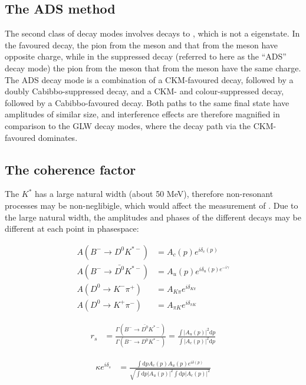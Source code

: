 \subsection{The ADS method}

The second class of decay modes involves \D decays to \Kmp\pipm, which is not a \CP eigenstate. In the favoured decay, the pion from the \D meson and that from the \Kstarm meson have opposite charge, while in the suppressed decay (referred to here as the ``ADS'' ~\cite{ADS,ADS-2001} decay mode) the pion from the \D meson that from the \Kstarm meson have the same charge. The ADS decay mode is a combination of a CKM-favoured \decay{\Bm}{\Dz\Kstarm} decay, followed by a doubly Cabibbo-suppressed \decay{\Dz}{\Kp\pim} decay, and a CKM- and colour-suppressed \decay{\Bm}{\Dzb\Kstarm} decay, followed by a Cabibbo-favoured \decay{\Dzb}{\Kp\pim} decay. Both paths to the same final state have amplitudes of similar size, and interference effects are therefore magnified in comparison to the GLW decay modes, where the decay path via the CKM-favoured \decay{\Bm}{\Dz\Kstarm} dominates.

\subsection{The coherence factor}

The $K^*$ has a large natural width (about 50 MeV), therefore non-resonant processes may be non-neglibigle, which would affect the measurement of \Pgamma. Due to the large natural width, the amplitudes and phases of the different decays may be different at each point in phasespace:

\begin{align*}
A(B^- \to D^0 K^{*-}) &= A_c(p) e^{i\delta_c(p)} \\
A(B^- \to \bar{D^0} K^{*-}) &= A_u(p) e^{i\delta_u(p) e^{-i\gamma}} \\
A(D^0 \to K^-\pi^+) &= A_{K\pi} e^{i\delta_{K\pi}} \\
A(D^0 \to K^+\pi^-) &= A_{{\pi}K} e^{i\delta_{{\pi}K}} 
\end{align*}

\begin{align*}
r_s &= \frac{\Gamma(B^- \to \bar{D^0}K^{*-})}{\Gamma(B^- \to D^0K^{*-})} = \frac{\int \left|A_u(p)\right|^2 \mathrm{d}p}{\int \left|A_c(p)\right|^2 \mathrm{d}p}
\end{align*}

\begin{align}
\kappa e^{i\delta_s} &= \frac{\int \mathrm{d}p A_c(p)A_u(p)e^{i\delta(p)}}{\sqrt{\int \mathrm{d}p \left|A_u(p)\right|^2 \int \mathrm{d}p \left|A_c(p)\right|^2}}
\label{kappadefinition}
\end{align}

